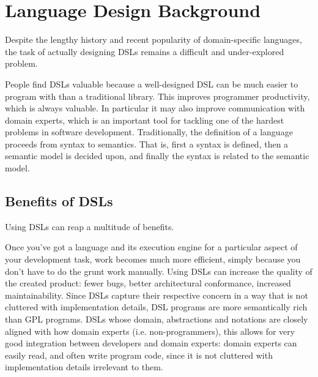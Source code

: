 \section{Language Design Background}
Despite the lengthy history and recent popularity of domain-specific languages, the task of actually
designing DSLs remains a difficult and under-explored problem. \cite{erwig2014semantics}

People find DSLs valuable because a well-designed DSL can be much easier to program with than a traditional library. This improves programmer productivity, which is always valuable. In particular it may also improve communication with domain experts, which is an important tool for tackling one of the hardest problems in software development.
Traditionally, the definition of a language proceeds from syntax to semantics. That is, first a syntax is
defined, then a semantic model is decided upon, and finally the syntax is related to the semantic model. 

\subsection{Benefits of DSLs}
Using DSLs can reap a multitude of benefits. 

Once you’ve got a language and its execution engine for a particular aspect of your development task, work becomes much more efficient, simply because you don’t have to do the grunt work manually. 
Using DSLs can increase the quality of the created product: fewer bugs, better architectural conformance, increased maintainability.
Since DSLs capture their respective concern in a way that is not cluttered with implementation details, DSL programs are more semantically rich than GPL programs.
DSLs whose domain, abstractions and notations are closely aligned with how domain experts (i.e. non-programmers), this allows for very good integration between developers and domain experts: domain experts can easily read, and often write program code, since it is not cluttered with implementation details irrelevant to them. \cite{voelter2013dsl}
